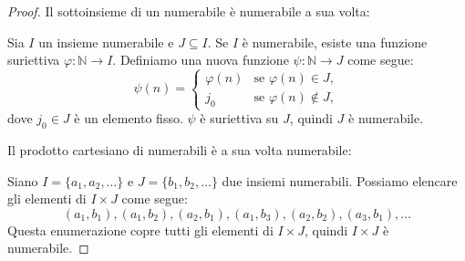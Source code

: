 \begin{proof}
	Il sottoinsieme di un numerabile è numerabile a sua volta:
	
	Sia $I$ un insieme numerabile e $J \subseteq I$. Se $I$ è numerabile, esiste una funzione suriettiva $\varphi: \mathbb{N} \to I$. Definiamo una nuova funzione $\psi: \mathbb{N} \to J$ come segue:
	\[
	\psi(n) =
	\begin{cases}
		\varphi(n) & \text{se } \varphi(n) \in J, \\
		j_0 & \text{se } \varphi(n) \notin J,
	\end{cases}
	\]
	dove $j_0 \in J$ è un elemento fisso. $\psi$ è suriettiva su $J$, quindi $J$ è numerabile.
	
	Il prodotto cartesiano di numerabili è a sua volta numerabile: 
	
	Siano $I = \{a_1, a_2, \dots\}$ e $J = \{b_1, b_2, \dots\}$ due insiemi numerabili. Possiamo elencare gli elementi di $I \times J$ come segue:
	\[
	(a_1, b_1), (a_1, b_2), (a_2, b_1), (a_1, b_3), (a_2, b_2), (a_3, b_1), \dots
	\]
	Questa enumerazione copre tutti gli elementi di $I \times J$, quindi $I \times J$ è numerabile.
\end{proof}